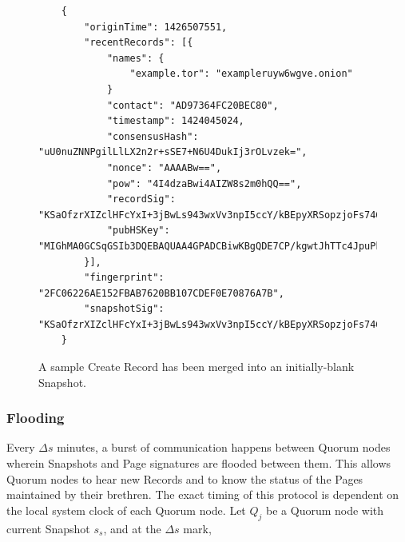 \begin{figure}
	\begin{lstlisting}
	{
		"originTime": 1426507551,
		"recentRecords": [{
			"names": {
				"example.tor": "exampleruyw6wgve.onion"
			}
			"contact": "AD97364FC20BEC80",
			"timestamp": 1424045024,
			"consensusHash": "uU0nuZNNPgilLlLX2n2r+sSE7+N6U4DukIj3rOLvzek=",
			"nonce": "AAAABw==",
			"pow": "4I4dzaBwi4AIZW8s2m0hQQ==",
			"recordSig": 	"KSaOfzrXIZclHFcYxI+3jBwLs943wxVv3npI5ccY/kBEpyXRSopzjoFs746n0tJqUpdY4Kbe6DBwERaN7ELmSSK9Pu6q8QeKzNAh+QOnKl0fKBN7fqowjkQ3ktFkR0Vuox9WrrbNTMa4+up0Np52hlbKA3zSRz4fbR9NVlh6uuQ=",
			"pubHSKey": "MIGhMA0GCSqGSIb3DQEBAQUAA4GPADCBiwKBgQDE7CP/kgwtJhTTc4JpuPkvA7Ln9wgc+fgTKgkyUp1zusxgUAn1c1MGx4YhO42KPB7dyZOf3pcRk94XsYFY1ULkF2+tf9KdNe7GFzJyMFCQENnUcVXbcwLH4vAeiGK7R/nScbCbyc9LT+VE1fbKchTL1QzLVBLqJTxhR+9YPi8x+QIFAdZ8BJs="
		}],
		"fingerprint": "2FC06226AE152FBAB7620BB107CDEF0E70876A7B",
		"snapshotSig": "KSaOfzrXIZclHFcYxI+3jBwLs943wxVv3npI5ccY/kBEpyXRSopzjoFs746n0tJqUpdY4Kbe6DBwERaN7ELmSSK9Pu6q8QeKzNAh+QOnKl0fKBN7fqowjkQ3ktFkR0Vuox9WrrbNTMa4+up0Np52hlbKA3zSRz4fbR9NVlh6uuQ="
	}
	\end{lstlisting}
	\caption{A sample Create Record has been merged into an initially-blank Snapshot.}
	\label{fig:recordInSS}
\end{figure}

\subsubsection{Flooding}






Every $ \Delta s $ minutes, a burst of communication happens between Quorum nodes wherein Snapshots and Page signatures are flooded between them. This allows Quorum nodes to hear new Records and to know the status of the Pages maintained by their brethren. The exact timing of this protocol is dependent on the local system clock of each Quorum node. Let $ Q_{j} $ be a Quorum node with current Snapshot $ s_{s} $, and at the $ \Delta s $ mark,


